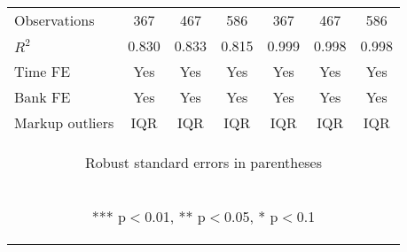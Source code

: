 \documentclass[]{article}
\begin{document}
\begin{center}
\begin{tabular}{lcccccc}
Observations & 367 & 467 & 586 & 367 & 467 & 586 \\
$R^2$ & 0.830 & 0.833 & 0.815 & 0.999 & 0.998 & 0.998 \\
Time FE & Yes & Yes & Yes & Yes & Yes & Yes \\
Bank FE & Yes & Yes & Yes & Yes & Yes & Yes \\
 Markup outliers & IQR & IQR & IQR & IQR & IQR & IQR \\ \hline
\multicolumn{7}{c}{\begin{footnotesize} Robust standard errors in parentheses\end{footnotesize}} \\
\multicolumn{7}{c}{\begin{footnotesize} *** p$<$0.01, ** p$<$0.05, * p$<$0.1\end{footnotesize}} \\
\end{tabular}
\end{center}
\end{document}
